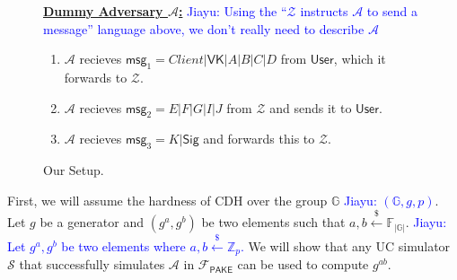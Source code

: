 \documentclass[12pt,a4paper]{article}
\newcommand{\simulator}{\mathcal{S}}
\newcommand{\env}{\mathcal{Z}}
\newcommand{\adv}{\mathcal{A}}
\newcommand{\pake}{\mathcal{F}_{\mathsf{PAKE}}}
\newcommand{\user}{\mathsf{User}}
\newcommand{\msg}[1]{\mathsf{msg}_{#1}}
\def\xjy#1{\textcolor{blue}{Jiayu: #1}}
\begin{document}
\begin{figure}[h]
\begin{framed}
\begin{enumerate}
			\end{enumerate}
			\textbf{\underline{Dummy Adversary $\adv$:}}
			\xjy{Using the ``$\env$ instructs $\adv$ to send a message'' language above, we don't really need to describe $\adv$}
			\begin{enumerate}
				\item $\adv$ recieves $\msg{1} = Client|\mathsf{VK}|A|B|C|D$ from $\user$, which it forwards to $\env$.
				\item $\adv$ recieves $\msg{2}=E|F|G|I|J$ from $\env$ and sends it to $\user$.
				\item $\adv$ recieves $\msg{3}=K|\mathsf{Sig}$ and forwards this to $\env$.
			\end{enumerate}
			\vspace{2mm}
		\end{framed}
		\caption{Our Setup.}
		\label{fig:adv}
	\end{figure}
	
	
	
	First, we will assume the hardness of CDH over the group $\mathbb{G}$ \xjy{$(\mathbb{G},g,p)$}. Let $g$ be a generator and $(g^a, g^b)$ be two elements such that $a,b\xleftarrow{\$}\mathbb{F}_{|\mathbb{G}|}$. \xjy{Let $g^a,g^b$ be two elements where $a,b\xleftarrow{\$}\mathbb{Z}_p$.} We will show that any UC simulator $\simulator$ that successfully simulates $\adv$ in $\pake$ can be used to compute $g^{ab}$.
	
\end{document}
